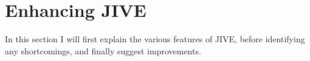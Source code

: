 \section{Enhancing JIVE}\label{enhJive}

In this section I will first explain the various features of JIVE, before identifying any shortcomings, and finally suggest improvements.





